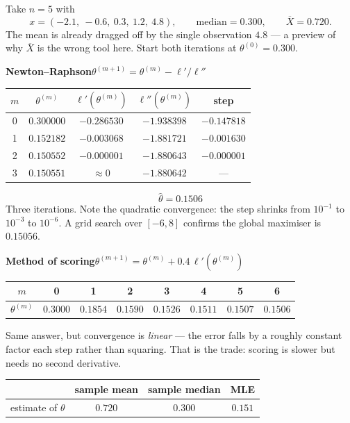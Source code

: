 \documentclass[11pt]{article}
\newcommand{\Xbar}{\overline{X}}
\begin{document}
Take $n=5$ with
\[
x=(-2.1,\ -0.6,\ 0.3,\ 1.2,\ 4.8),
\qquad
\text{median}=0.300,\qquad \Xbar=0.720 .
\]
The mean is already dragged off by the single observation $4.8$ --- a preview of why $\Xbar$
is the wrong tool here. Start both iterations at $\theta^{(0)}=0.300$.

\begin{center}
\textbf{Newton--Raphson}\quad $\theta^{(m+1)}=\theta^{(m)}-\ell'/\ell''$

\renewcommand{\arraystretch}{1.3}
\begin{tabular}{@{}ccccc@{}}
\toprule
$m$ & $\theta^{(m)}$ & $\ell'(\theta^{(m)})$ & $\ell''(\theta^{(m)})$ & step \\
\midrule
0 & $0.300000$ & $-0.286530$ & $-1.938398$ & $-0.147818$ \\
1 & $0.152182$ & $-0.003068$ & $-1.881721$ & $-0.001630$ \\
2 & $0.150552$ & $-0.000001$ & $-1.880643$ & $-0.000001$ \\
3 & $0.150551$ & $\approx0$ & $-1.880642$ & --- \\
\bottomrule
\end{tabular}
\end{center}

\[
\boxed{\ \hat\theta=0.1506\ }
\]
Three iterations. Note the quadratic convergence: the step shrinks from $10^{-1}$ to
$10^{-3}$ to $10^{-6}$. A grid search over $[-6,8]$ confirms the global maximiser is
$0.15056$.

\begin{center}
\textbf{Method of scoring}\quad $\theta^{(m+1)}=\theta^{(m)}+0.4\,\ell'(\theta^{(m)})$

\renewcommand{\arraystretch}{1.25}
\begin{tabular}{@{}cccccccc@{}}
\toprule
$m$ & 0 & 1 & 2 & 3 & 4 & 5 & 6 \\
\midrule
$\theta^{(m)}$ & $0.3000$ & $0.1854$ & $0.1590$ & $0.1526$ & $0.1511$ & $0.1507$ & $0.1506$ \\
\bottomrule
\end{tabular}
\end{center}

Same answer, but convergence is \emph{linear} --- the error falls by a roughly constant factor
each step rather than squaring. That is the trade: scoring is slower but needs no second
derivative.

\begin{center}
\renewcommand{\arraystretch}{1.3}
\begin{tabular}{@{}lccc@{}}
\toprule
& sample mean & sample median & MLE \\
\midrule
estimate of $\theta$ & $0.720$ & $0.300$ & $\mathbf{0.151}$ \\
\bottomrule
\end{tabular}
\end{center}
\end{document}
